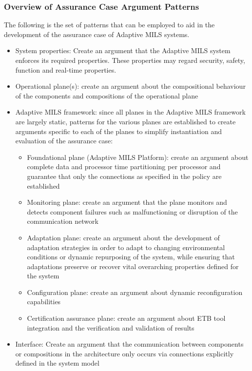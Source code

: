 \documentclass[12pt,twoside,a4paper]{article}
\begin{document}

\subsubsection{Overview of Assurance Case Argument Patterns}
The following is the set of patterns that can be employed to aid in the development of the assurance case of Adaptive MILS systems.

\begin{itemize}
\item System properties: Create an argument that the Adaptive MILS system enforces its required properties. These properties may regard security, safety, function and real-time properties.
\item Operational plane(s): create an argument about the compositional behaviour of the components and compositions of the operational plane
\item Adaptive MILS framework: since all planes in the Adaptive MILS framework are largely static, patterns for the various planes are established to create arguments specific to each of the planes to simplify instantiation and evaluation of the assurance case:
	\begin{itemize}
	\item Foundational plane (Adaptive MILS Platform): create an argument about complete data and processor time partitioning per processor and guarantee that only the connections as specified in the policy are established
	\item Monitoring plane: create an argument that the plane monitors and detects component failures such as malfunctioning or disruption of the communication network
	\item Adaptation plane: create an argument about the development of adaptation strategies in order to adapt to changing environmental conditions or dynamic repurposing of the system, while ensuring that adaptations preserve or recover vital overarching properties defined for the system
	\item Configuration plane: create an argument about dynamic reconfiguration capabilities
	\item Certification assurance plane: create an argument about ETB tool integration and the verification and validation of results
	\end{itemize}
\item Interface: Create an argument that the communication between components or compositions in the architecture only occurs via connections explicitly defined in the system model

\end{itemize}
\end{document}
